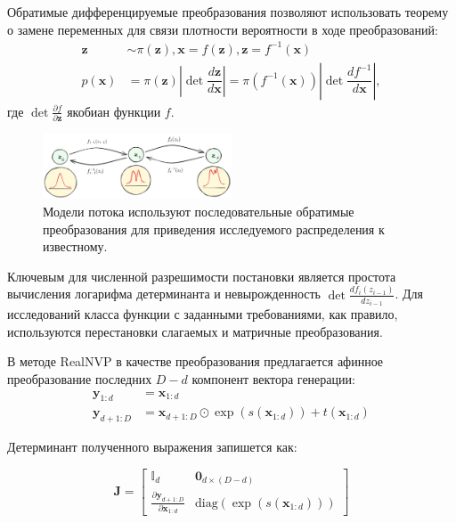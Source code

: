 Обратимые дифференцируемые преобразования позволяют использовать теорему о замене переменных для связи плотности вероятности в ходе преобразований:
\begin{equation}
    \begin{aligned}
        \mathbf{z} &\sim \pi(\mathbf{z}), \mathbf{x} = f(\mathbf{z}), \mathbf{z} = f^{-1}(\mathbf{x}) \\
        p(\mathbf{x}) 
        &= \pi(\mathbf{z}) \left\vert \det \dfrac{d \mathbf{z}}{d \mathbf{x}} \right\vert  
        = \pi(f^{-1}(\mathbf{x})) \left\vert \det \dfrac{d f^{-1}}{d \mathbf{x}} \right\vert,
    \end{aligned}
\end{equation}
где $\det \frac{\partial f}{\partial\mathbf{z}}$ якобиан функции $f$.

\begin{figure}[h]
    \centering
    \includegraphics[width=0.5\textwidth]{assets/ml/generation/flow.excalidraw.png}
    \caption{Модели потока используют последовательные обратимые преобразования для приведения исследуемого распределения к известному.}
    \label{flow}
\end{figure}

Ключевым для численной разрешимости постановки является простота вычисления логарифма детерминанта и невырожденность $\det \frac{d f_i(z_{i-1})}{d z_{i-1}}$. 
Для исследований класса функции с заданными требованиями, как правило, используются перестановки слагаемых и матричные преобразования.

В методе RealNVP в качестве преобразования предлагается афинное преобразование последних $D-d$ компонент вектора генерации:  
\begin{equation}
    \begin{aligned}
        \mathbf{y}_{1:d} &= \mathbf{x}_{1:d} \\ 
        \mathbf{y}_{d+1:D} &= \mathbf{x}_{d+1:D} \odot \exp({s(\mathbf{x}_{1:d})}) + t(\mathbf{x}_{1:d})
    \end{aligned}
\end{equation}

Детерминант полученного выражения запишется как:

\begin{equation}
    \mathbf{J} = 
    \begin{bmatrix}
    \mathbb{I}_d & \mathbf{0}_{d\times(D-d)} \\[5pt]
    \frac{\partial \mathbf{y}_{d+1:D}}{\partial \mathbf{x}_{1:d}} & \text{diag}(\exp(s(\mathbf{x}_{1:d})))
    \end{bmatrix}
\end{equation}

